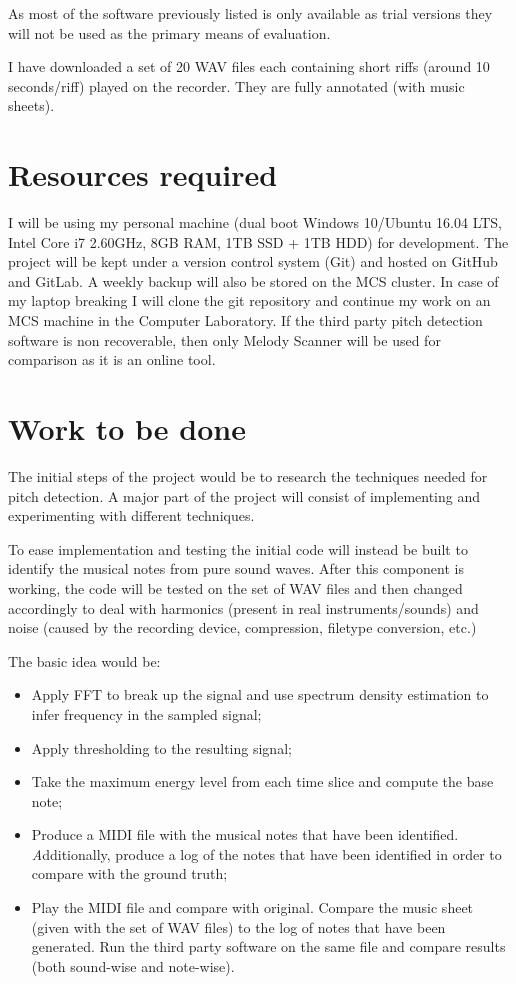 \documentclass[12pt,a4paper,twoside]{article}
\begin{document}
As most of the software previously listed is only available as trial versions they will not be used as the primary means of evaluation.

I have downloaded a set of 20 WAV files each containing short riffs (around 10 seconds/riff) played on the recorder. They are fully annotated (with music sheets).

\section*{Resources required}

I will be using my personal machine (dual boot Windows 10/Ubuntu 16.04 LTS, Intel Core i7 2.60GHz, 8GB RAM, 1TB SSD + 1TB HDD) for development.
  The project will be kept under a version control system (Git) and hosted on GitHub and GitLab. A weekly backup will also be stored on the MCS cluster.
  In case of my laptop breaking I will clone the git repository and continue my work on an MCS machine in the Computer Laboratory. If the third party pitch detection software is non recoverable, then only Melody Scanner will be used for comparison as it is an online tool.

\section*{Work to be done}

The initial steps of the project would be to research the techniques needed for pitch detection.
A major part of the project will consist of implementing and experimenting with different techniques.

To ease implementation and testing the initial code will instead be built to identify the musical notes from pure sound waves.
After this component is working, the code will be tested on the set of WAV files and then changed accordingly to deal with harmonics (present in real instruments/sounds) and noise (caused by the recording device, compression, filetype conversion, etc.)

The basic idea would be:
\begin{itemize}
  \item Apply FFT to break up the signal and use spectrum density estimation to infer frequency in the sampled signal;
  \item Apply thresholding to the resulting signal;
  \item Take the maximum energy level from each time slice and compute the base note;
  \item Produce a MIDI file with the musical notes that have been identified.
  \emph Additionally, produce a log of the notes that have been identified in order to compare with the ground truth;
  \item Play the MIDI file and compare with original. Compare the music sheet (given with the set of WAV files) to the log of notes that have been generated. Run the third party software on the same file and compare results (both sound-wise and note-wise).
\end{itemize}
\end{document}
